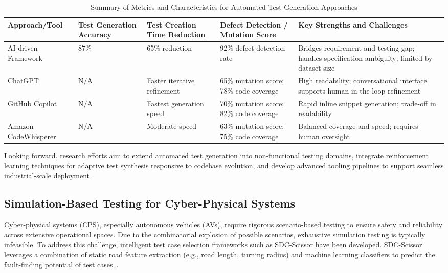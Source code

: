 \documentclass[sigconf]{acmart}
\begin{document}
\begin{table*}[htbp]
\centering
\caption{Summary of Metrics and Characteristics for Automated Test Generation Approaches}
\label{tab:test_generation_summary}
\begin{adjustbox}{max width=\textwidth}
\begin{tabular}{@{}lllll@{}}
\toprule
Approach/Tool & Test Generation Accuracy & Test Creation Time Reduction & Defect Detection / Mutation Score & Key Strengths and Challenges \\ \midrule
AI-driven Framework \cite{ref30} & 87\% & 65\% reduction & 92\% defect detection rate & Bridges requirement and testing gap; handles specification ambiguity; limited by dataset size \\ 
ChatGPT \cite{ref32} & N/A & Faster iterative refinement & 65\% mutation score; 78\% code coverage & High readability; conversational interface supports human-in-the-loop refinement \\ 
GitHub Copilot \cite{ref32} & N/A & Fastest generation speed & 70\% mutation score; 82\% code coverage & Rapid inline snippet generation; trade-off in readability \\ 
Amazon CodeWhisperer \cite{ref32} & N/A & Moderate speed & 63\% mutation score; 75\% code coverage & Balanced coverage and speed; requires human oversight \\ \bottomrule
\end{tabular}
\end{adjustbox}
\end{table*}

Looking forward, research efforts aim to extend automated test generation into non-functional testing domains, integrate reinforcement learning techniques for adaptive test synthesis responsive to codebase evolution, and develop advanced tooling pipelines to support seamless industrial-scale deployment \cite{ref30}.

\subsection{Simulation-Based Testing for Cyber-Physical Systems}

Cyber-physical systems (CPS), especially autonomous vehicles (AVs), require rigorous scenario-based testing to ensure safety and reliability across extensive operational spaces. Due to the combinatorial explosion of possible scenarios, exhaustive simulation testing is typically infeasible. To address this challenge, intelligent test case selection frameworks such as SDC-Scissor have been developed. SDC-Scissor leverages a combination of static road feature extraction (e.g., road length, turning radius) and machine learning classifiers to predict the fault-finding potential of test cases~\cite{ref29}.
\end{document}
